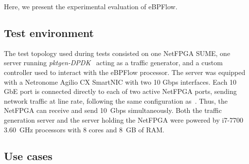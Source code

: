 
Here, we present the experimental evaluation of eBPFlow. 

\subsection{Test environment} 
\label{sec:experiments}



The test topology used during tests consisted on one NetFPGA SUME, one server running \textit{pktgen-DPDK}~\cite{Pktgen2016} acting as a traffic generator, and a custom controller used to interact with the eBPFlow processor. The server was equipped with a Netronome Agilio CX SmartNIC with two 10 Gbps interfaces. Each 10 GbE port is connected directly to each of two active NetFPGA ports, sending network traffic at line rate, following the same configuration as~\cite{FlowBlaze2019}. Thus, the NetFPGA can receive and send 10~Gbps simultaneously. Both the traffic generation server and the server holding the NetFPGA were powered by i7-7700 \@ 3.60~GHz processors with 8 cores and 8~GB of RAM.



\subsection{Use cases}
\label{sec:use-cases}

